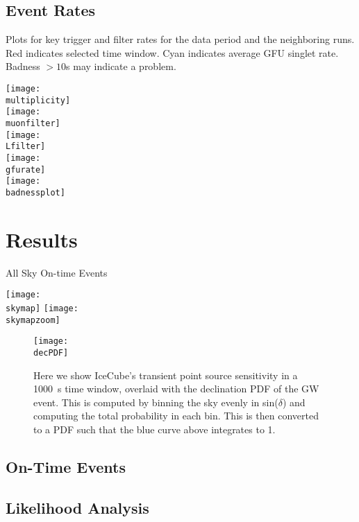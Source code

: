 \documentclass[titlepage]{article}
\begin{document}
\pagebreak
\subsection{Event Rates}
Plots for key trigger and filter rates for the data period
and the neighboring runs.  Red indicates selected time window.
Cyan indicates average GFU singlet rate. Badness $>10$s may indicate
a problem.

\vspace{1em}
{
 \centering
 \texttt{[image: \\multiplicity]}\\
 \texttt{[image: \\muonfilter]}\\
 \texttt{[image: \\Lfilter]}\\
 \texttt{[image: \\gfurate]}\\
 \texttt{[image: \\badnessplot]}
}
\vspace{2cm}

\pagebreak

\section{Results}

{
  \centering
  {\Large All Sky On-time Events}

  \texttt{[image: \\skymap]}
  \vspace{3cm}
  \texttt{[image: \\skymapzoom]}
}

\begin{figure}
    \centering
    \texttt{[image: \\decPDF]}
    \caption{Here we show IceCube's transient point source sensitivity in a 1000~s time window, overlaid with the declination PDF of the GW event. This is computed by binning the sky evenly in sin($\delta$) and computing the total probability in each bin. This is then converted to a PDF such that the blue curve above integrates to 1.}
\end{figure}

\newpage
\subsection{On-Time Events}
\event

\subsection{Likelihood Analysis}
\results
\end{document}
